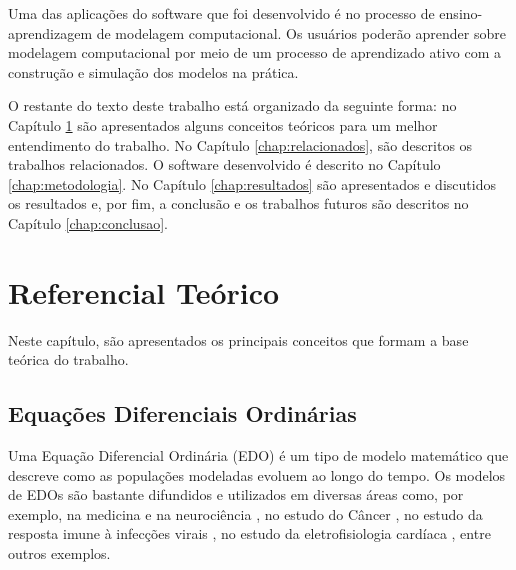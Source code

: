 \documentclass[
	12pt,				%
	openright,			%
	oneside,			%
	a4paper,			%
	main=brazil,
	english,			%
	]{ufsj-abntex2}
\begin{document}
Uma das aplicações do software que foi desenvolvido é no processo de ensino-aprendizagem de modelagem computacional. Os usuários poderão aprender sobre modelagem computacional por meio de um processo de aprendizado ativo com a construção e simulação dos modelos na prática. 

O restante do texto deste trabalho está organizado da seguinte forma: no Capítulo \ref{chap:referencial} são apresentados alguns conceitos teóricos para um melhor entendimento do trabalho. No Capítulo \ref{chap:relacionados}, são descritos os trabalhos relacionados. O software desenvolvido é descrito no Capítulo \ref{chap:metodologia}. No Capítulo \ref{chap:resultados} são apresentados e discutidos os resultados e, por fim, a conclusão e os trabalhos futuros são descritos no Capítulo \ref{chap:conclusao}. 


\chapter{Referencial Teórico}
\label{chap:referencial}

Neste capítulo, são apresentados os principais conceitos que formam a base teórica do trabalho. 

\section{Equações Diferenciais Ordinárias}

Uma Equação Diferencial Ordinária (EDO) é um tipo de modelo matemático que descreve como as populações modeladas evoluem ao longo do tempo. Os modelos de EDOs são bastante difundidos e utilizados em diversas áreas como, por exemplo, na medicina e na neurociência \cite{ADOMIAN1995107}, no estudo do Câncer \cite{spencer2004ordinary, talkington2018ordinary}, no estudo da resposta imune à infecções virais \cite{reis2021validated}, no estudo da eletrofisiologia cardíaca \cite{VIGMOND20083, bucelli2022mathematical}, entre outros exemplos. 
\end{document}
